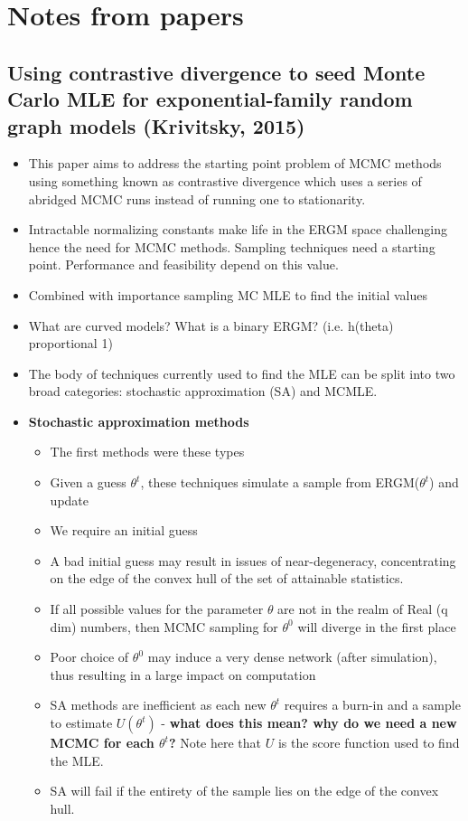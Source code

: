 	
\section{Notes from papers}

\subsection{Using contrastive divergence to seed Monte Carlo MLE for exponential-family
random graph models (Krivitsky, 2015)}

\begin{itemize}

    \item This paper aims to address the starting point problem of MCMC methods using something known as contrastive divergence which uses a series of abridged MCMC runs instead of running one to stationarity.
    \item Intractable normalizing constants make life in the ERGM space challenging hence the need for MCMC methods. Sampling techniques need a starting point. Performance and feasibility depend on this value.
    \item Combined with importance sampling MC MLE to find the initial values
    \item What are curved models? What is a binary ERGM? (i.e. h(theta) proportional 1)
    \item The body of techniques currently used to find the MLE can be split into two broad categories: stochastic approximation (SA) and MCMLE.
    \item \textbf{Stochastic approximation methods}
    \begin{itemize}
        \item The first methods were these types
        \item Given a guess $\theta^{t}$, these techniques simulate a sample from ERGM($\theta^{t}$) and update
        \item We require an initial guess
        \item A bad initial guess may result in issues of near-degeneracy, concentrating on the edge of the convex hull of the set of attainable statistics.
        \item If all possible values for the parameter $\theta$ are not in the realm of Real (q dim) numbers, then MCMC sampling for $\theta^{0}$ will diverge in the first place
        \item Poor choice of $\theta^{0}$ may induce a very dense network (after simulation), thus resulting in a large impact on computation
        \item SA methods are inefficient as each new $\theta^{t}$ requires a burn-in and a sample to estimate $U(\theta^{t})$ - \textbf{what does this mean? why do we need a new MCMC for each $\theta^{t}$?} Note here that $U$ is the score function used to find the MLE.
        \item SA will fail if the entirety of the sample lies on the edge of the convex hull.
    \end{itemize}


\end{itemize}
